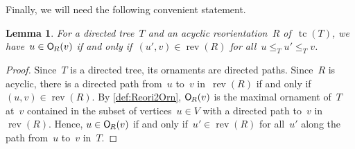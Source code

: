\documentclass{amsart}
\newtheorem{lemma}[theorem]{Lemma}
\theoremstyle{definition}
\renewcommand{\c}[1]{\mathcal{#1}} %
\newcommand{\ssm}{\smallsetminus} %
\DeclareMathOperator{\tc}{tc} %
\newcommand{\Vincent}[1]{\todo[size=\tiny,color=blue!30]{ #1 \\ \hfill --- V.}\,}
\newcommand{\mymap}[2]{\mathsf{#1}_{\hspace{-.7pt}#2}}
\DeclareMathOperator{\Orn}{\c{O}}  %
\newcommand{\orn}[1]{\mymap{O}{#1}}  %
\DeclareMathOperator{\rev}{rev} %
\begin{document}
%


Finally, we will need the following convenient statement.

\begin{lemma}
\label{lem:Reori2OrnT}
For a directed tree~$T$ and an acyclic reorientation~$R$ of~$\tc(T)$, we have~$u \in \orn{R}(v)$ if and only if~$(u',v) \in \rev(R)$ for all~$u \le_T u' \le_T v$.
\end{lemma}

\begin{proof}
Since~$T$ is a directed tree, its ornaments are directed paths.
Since~$R$ is acyclic, there is a directed path from~$u$ to~$v$ in~$\rev(R)$ if and only if~$(u,v) \in \rev(R)$.
By \cref{def:Reori2Orn}, $\orn{R}(v)$ is the maximal ornament of~$T$ at~$v$ contained in the subset of vertices~$u \in V$ with a directed path to~$v$ in $\rev(R)$.
Hence, $u \in \orn{R}(v)$ if and only if~$u' \in \rev(R)$ for all~$u'$ along the path from~$u$ to~$v$ in~$T$.
\end{proof}

\end{document}
